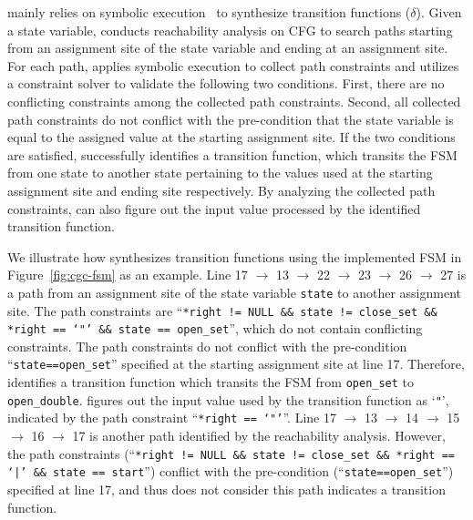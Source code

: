 \Tool{} mainly relies on symbolic execution~\cite{klee,s2e} 
to synthesize transition functions ($\delta$).  
Given a state variable,
\Tool{} conducts reachability analysis on CFG to search paths starting 
from an assignment site of the state variable 
and ending at an assignment site. 
For each path, \Tool{} applies symbolic execution to 
collect path constraints and utilizes a constraint solver to validate 
the following two conditions. 
First, there are no conflicting constraints among the collected path constraints. 
Second, all collected path constraints do not conflict with the pre-condition
that the state variable is equal to the assigned value at the starting assignment site. 
If the two conditions are satisfied, 
\Tool{} successfully identifies a transition function, 
which transits the FSM from one state to another state pertaining to 
the values used at the starting assignment 
site and ending site respectively. 
By analyzing the collected path constraints, 
\Tool{} can also figure out the input value processed by
the identified transition function. 




We illustrate how \Tool{} synthesizes transition functions using 
the implemented FSM in Figure~\ref{fig:cgc-fsm} as an example. 
Line 17 $\rightarrow$ 13 $\rightarrow$ 22 $\rightarrow$ 23 $\rightarrow$ 26 $\rightarrow$ 27
is a path from an assignment site of the state variable \texttt{state} 
to another assignment site. 
The path constraints are 
``\texttt{*right != NULL \&\& state != close\_set \&\& *right == `"' \&\& state == open\_set}'', 
which do not contain conflicting constraints. 
The path constraints do not conflict with the pre-condition ``\texttt{state==open\_set}'' 
specified at the starting assignment site at line 17.
Therefore, \Tool{} identifies a transition function which transits the FSM from  
\texttt{open\_set} to \texttt{open\_double}. 
\Tool{} figures out the input value used by the 
transition function as `\texttt{"}', 
indicated by the path 
constraint ``\texttt{*right == `"'}''.  
Line 17 $\rightarrow$ 13 $\rightarrow$ 14 $\rightarrow$ 15 
$\rightarrow$ 16 $\rightarrow$ 17
is another path identified by the reachability analysis. 
However, the path constraints (``\texttt{*right != NULL \&\& state != close\_set \&\& *right == `|' \&\& state == start}'') 
conflict 
with the pre-condition (``\texttt{state==open\_set}'') specified at line 17, 
and thus \Tool{} does not consider 
this path indicates a transition function. 




